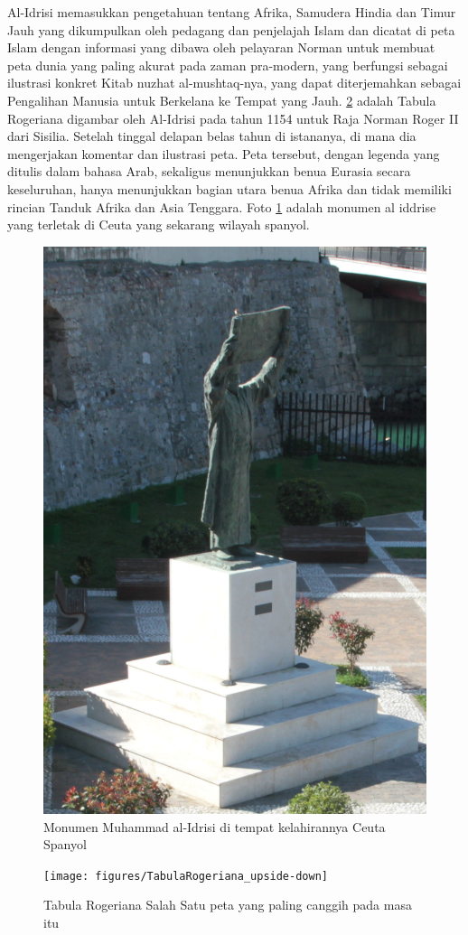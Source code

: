 	Al-Idrisi memasukkan pengetahuan tentang Afrika, Samudera Hindia dan Timur Jauh yang dikumpulkan oleh pedagang dan penjelajah Islam dan dicatat di peta Islam dengan informasi yang dibawa oleh pelayaran Norman untuk membuat peta dunia yang paling akurat pada zaman pra-modern, yang berfungsi sebagai ilustrasi konkret Kitab nuzhat al-mushtaq-nya, yang dapat diterjemahkan sebagai Pengalihan Manusia untuk Berkelana ke Tempat yang Jauh. 
	\ref{TabulaRogeriana_upside-down} adalah Tabula Rogeriana digambar oleh Al-Idrisi pada tahun 1154 untuk Raja Norman Roger II dari Sisilia. Setelah tinggal delapan belas tahun di istananya, di mana dia mengerjakan komentar dan ilustrasi peta. Peta tersebut, dengan legenda yang ditulis dalam bahasa Arab, sekaligus menunjukkan benua Eurasia secara keseluruhan, hanya menunjukkan bagian utara benua Afrika dan tidak memiliki rincian Tanduk Afrika dan Asia Tenggara. Foto \ref{Fotoal-Idrisi} adalah monumen al iddrise yang terletak di Ceuta yang sekarang wilayah spanyol.
	\begin{figure} [ht]
	\centerline{\includegraphics[width=.5\textwidth]{figures/monumenaliddrisi}}
	\caption{Monumen Muhammad al-Idrisi di tempat kelahirannya Ceuta Spanyol}
	\label{Fotoal-Idrisi}
	\end{figure}
	 
	
	\begin{figure} [ht]
	\centerline{\texttt{[image: figures/TabulaRogeriana\_upside-down]}}
	\caption{Tabula Rogeriana Salah Satu peta yang paling canggih pada masa itu}
	\label{TabulaRogeriana_upside-down}
	\end{figure}
	
